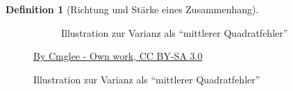 \documentclass[
  a4paper,
  DIV=11]{scrreprt}
\theoremstyle{definition}
\theoremstyle{definition}
\theoremstyle{definition}
\newtheorem{definition}{Definition}[chapter]
\theoremstyle{remark}
\begin{document}
\begin{definition}[Richtung und Stärke eines
Zusammenhang]
\begin{figure}
\begin{minipage}{0.50\linewidth}
\begin{figure}[H]


\caption{\label{fig-var}Illustration zur Varianz als ``mittlerer
Quadratfehler''}

\end{figure}%

\href{https://commons.wikimedia.org/w/index.php?curid=39472834}{By
Cmglee - Own work, CC BY-SA 3.0}\end{minipage}%

\end{figure}%


\end{definition}
\end{document}
